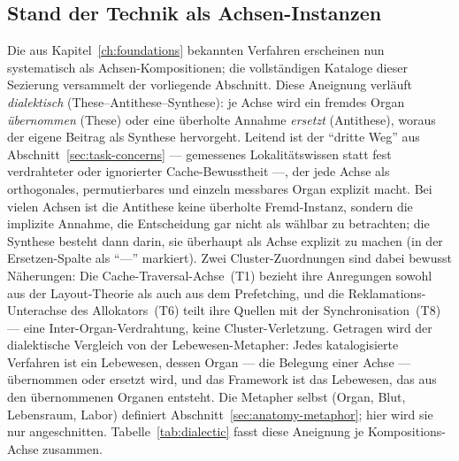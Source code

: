 \begin{nurlang}
\section{Stand der Technik als Achsen-Instanzen}\label{sec:sota-instances}
Die aus Kapitel~\ref{ch:foundations} bekannten Verfahren erscheinen nun systematisch als
Achsen-Kompositionen; die vollständigen Kataloge dieser Sezierung versammelt der vorliegende Abschnitt.
Diese Aneignung verläuft \emph{dialektisch} (These--Antithese--Synthese): je Achse wird ein fremdes Organ
\emph{übernommen} (These) oder eine überholte Annahme \emph{ersetzt} (Antithese), woraus der eigene
Beitrag als Synthese hervorgeht. Leitend ist der \enquote{dritte Weg} aus
Abschnitt~\ref{sec:task-concerns} --- gemessenes Lokalitätswissen statt fest verdrahteter oder
ignorierter Cache-Bewusstheit ---, der jede Achse als orthogonales, permutierbares und einzeln messbares
Organ explizit macht. Bei vielen Achsen ist die Antithese keine überholte Fremd-Instanz, sondern die
implizite Annahme, die Entscheidung gar nicht als wählbar zu betrachten; die Synthese besteht dann darin,
sie überhaupt als Achse explizit zu machen (in der Ersetzen-Spalte als \enquote{---} markiert). Zwei
Cluster-Zuordnungen sind dabei bewusst Näherungen: Die Cache-Traversal-Achse~(T1) bezieht ihre
Anregungen sowohl aus der Layout-Theorie als auch aus dem Prefetching, und die Reklamations-Unterachse
des Allokators~(T6) teilt ihre Quellen mit der Synchronisation~(T8) --- eine Inter-Organ-Verdrahtung,
keine Cluster-Verletzung. Getragen wird der dialektische Vergleich von der Lebewesen-Metapher: Jedes
katalogisierte Verfahren ist ein Lebewesen, dessen Organ --- die Belegung einer Achse --- übernommen oder
ersetzt wird, und das Framework ist das Lebewesen, das aus den übernommenen Organen entsteht. Die
Metapher selbst (Organ, Blut, Lebensraum, Labor) definiert Abschnitt~\ref{sec:anatomy-metaphor}; hier
wird sie nur angeschnitten.
Tabelle~\ref{tab:dialectic} fasst diese Aneignung je Kompositions-Achse zusammen.
\end{nurlang}
